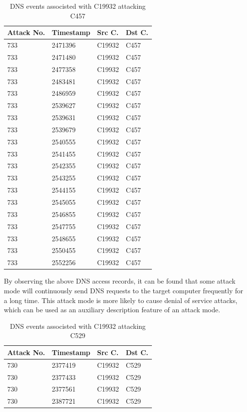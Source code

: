 \documentclass[12pt,journal,draftcls,doublespace, letterpaper,onecolumn]{IEEEtran}
\begin{document}
\begin{table}[h]
	\caption{DNS events associsted with C19932 attacking C457}
	\vspace{1pt}
	\centering
	\begin{tabular}{p{2.5cm}p{2.5cm}p{2.5cm}p{2.5cm}}
		\hline
		Attack No. & Timestamp & Src C. & Dst C. \\
		\hline
		733 & 2471396 & C19932 & C457\\
		733 & 2471480 & C19932 & C457\\
		733 & 2477358 & C19932 & C457\\
		733 & 2483481 & C19932 & C457\\
		733 & 2486959 & C19932 & C457\\
		733 & 2539627 & C19932 & C457\\
		733 & 2539631 & C19932 & C457\\
		733 & 2539679 & C19932 & C457\\
		733 & 2540555 & C19932 & C457\\
		733 & 2541455 & C19932 & C457\\
		733 & 2542355 & C19932 & C457\\
		733 & 2543255 & C19932 & C457\\
		733 & 2544155 & C19932 & C457\\
		733 & 2545055 & C19932 & C457\\
		733 & 2546855 & C19932 & C457\\
		733 & 2547755 & C19932 & C457\\
		733 & 2548655 & C19932 & C457\\
		733 & 2550455 & C19932 & C457\\
		733 & 2552256 & C19932 & C457\\
		\hline       
	\end{tabular}
	\label{bs2}
\end{table}

By observing the above DNS access records, it can be found that some attack mode will continuously send DNS requests to the target computer frequently for a long time. This attack mode is more likely to cause denial of service attacks, which can be used as an auxiliary description feature of an attack mode.

\begin{table}[h]
	\caption{DNS events associsted with C19932 attacking C529}
	\vspace{1pt}
	\centering
	\begin{tabular}{p{2.5cm}p{2.5cm}p{2.5cm}p{2.5cm}}
		\hline
		Attack No. & Timestamp & Src C. & Dst C. \\
		\hline
		730 & 2377419 & C19932 & C529\\
		730 & 2377433 & C19932 & C529\\
		730 & 2377561 & C19932 & C529\\
		730 & 2387721 & C19932 & C529\\
		\hline       
	\end{tabular}
	\label{bs2}
\end{table}
\end{document}
